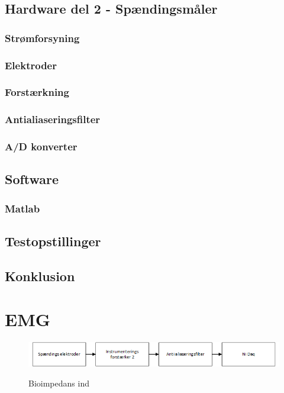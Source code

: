 \section{Hardware del 2 - Spændingsmåler}
\subsection{Strømforsyning}
\subsection{Elektroder}
\subsection{Forstærkning}
\subsection{Antialiaseringsfilter}
\subsection{A/D konverter}


\section{Software}
\subsection{Matlab}

\section{Testopstillinger}
\section{Konklusion}

\chapter{EMG}


\begin{figure}[H]
\centering
{\includegraphics[width=\linewidth]
{Figure/analyse2}}
\caption{Bioimpedans ind}
\label{analyse2}
\end{figure}



